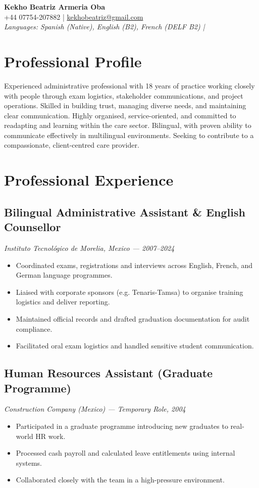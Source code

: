 \documentclass[11pt,a4paper]{article}
\begin{document}
	\begin{center}
		{\LARGE \textbf{Kekho Beatriz Armeria Oba}}\\[1mm]
		 +44 07754-207882 \quad | \quad \href{mailto:kekhobeatriz@gmail.com}{kekhobeatriz@gmail.com}\\
		\textit{Languages: Spanish (Native), English (B2), French (DELF B2) \quad | \quad }
		\end{center}	
	\vspace{1em}
	
	\section*{Professional Profile}
	Experienced administrative professional with 18 years of practice working closely with people through exam logistics, stakeholder communications, and project operations. Skilled in building trust, managing diverse needs, and maintaining clear communication. Highly organised, service-oriented, and committed to readapting and learning within the care sector. Bilingual, with proven ability to communicate effectively in multilingual environments. Seeking to contribute to a compassionate, client-centred care provider.
	
	\section*{Professional Experience}
	
	\subsection*{Bilingual Administrative Assistant \& English Counsellor}
	\textit{Instituto Tecnol\'ogico de Morelia, Mexico --- 2007--2024}
	\begin{itemize}[leftmargin=*]
		\item Coordinated exams, registrations and interviews across English, French, and German language programmes.
		\item Liaised with corporate sponsors (e.g. Tenaris-Tamsa) to organise training logistics and deliver reporting.
		\item Maintained official records and drafted graduation documentation for audit compliance.
		\item Facilitated oral exam logistics and handled sensitive student communication.
	\end{itemize}
	
	\subsection*{Human Resources Assistant (Graduate Programme)}
	\textit{Construction Company (Mexico) --- Temporary Role, 2004}
	\begin{itemize}[leftmargin=*]
		\item Participated in a graduate programme introducing new graduates to real-world HR work.
		\item Processed cash payroll and calculated leave entitlements using internal systems.
		\item Collaborated closely with the team in a high-pressure environment.
	\end{itemize}
	
\end{document}
